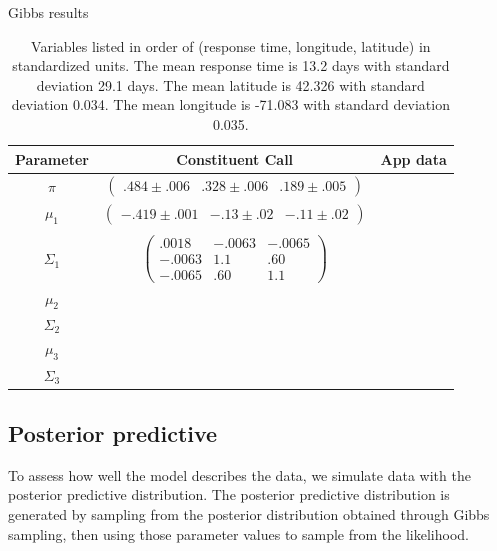 \documentclass[twoside]{article}
\theoremstyle{theorem}
\theoremstyle{theorem}
\theoremstyle{theorem}
\theoremstyle{lemma}
\theoremstyle{definition}
\theoremstyle{example}
\begin{document}
\begin{table}[h]
\caption{Gibbs results}
\label{comparison}
\begin{center}
\begin{tabular}{c|c|c}
Parameter & Constituent Call & App data\\
\hline
$\pi$ &
$\left(\begin{array}{ccc} .484\pm.006 & .328\pm.006  &.189\pm.005 \end{array}\right)$ 

\\

$\mu_1 $ &       
$\left(\begin{array}{ccc} -.419\pm.001 & -.13\pm.02  &-.11\pm.02 \end{array}\right)$ 
     
&\\
\\
$\Sigma_1$ & 
$\left(\begin{array}{ccc} .0018 & -.0063  &-.0065 \\
-.0063 & 1.1 &.60 \\
-.0065 & .60 & 1.1
\end{array}\right)$ 

& 

\\
$\mu_2 $           &  \\
$\Sigma_2$  & \\
$\mu_3$ & \\
$\Sigma_3$ &  \\
\end{tabular}
\caption*{Variables listed in order of (response time, longitude, latitude) in standardized units. The mean response time is 13.2 days with standard deviation 29.1 days. The mean latitude is 42.326 with standard deviation 0.034. The mean longitude is -71.083 with standard deviation 0.035. }
\end{center}
\end{table}
\subsection{Posterior predictive}
To assess how well the model describes the data, we simulate data with the posterior predictive distribution. The posterior predictive distribution is generated by sampling from the posterior distribution obtained through Gibbs sampling, then using those parameter values to sample from the likelihood. 
\end{document}
